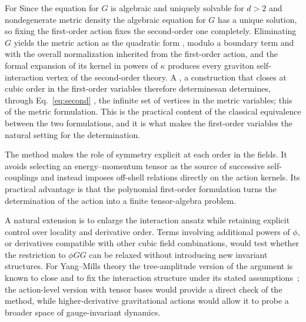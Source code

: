 \documentclass[prd,aps,preprint,superscriptaddress,nofootinbib,amsmath,amssymb,eqsecnum]{revtex4-2}
\providecommand{\DIFaddtex}[1]{{\protect\color{blue} \sf #1}} %
\providecommand{\DIFdeltex}[1]{{\protect\color{red} \scriptsize #1}} %
\providecommand{\DIFaddbegin}{} %
\providecommand{\DIFaddend}{} %
\providecommand{\DIFdelbegin}{} %
\providecommand{\DIFdelend}{} %
\providecommand{\DIFadd}[1]{\texorpdfstring{\DIFaddtex{#1}}{#1}} %
\providecommand{\DIFdel}[1]{\texorpdfstring{\DIFdeltex{#1}}{}} %
\begin{document}
\DIFdelbegin \DIFdel{For }\DIFdelend \DIFaddbegin \DIFadd{Since the equation for $G$ is algebraic and uniquely solvable for }\DIFaddend $d>2$ and nondegenerate
metric density\DIFdelbegin \DIFdel{the algebraic equation for $G$ has a unique
solution, so fixing the first-order action fixes the second-order one completely.
Eliminating $G$ yields the metric action as the quadratic form }%
\DIFdel{, modulo a boundary term and with the overall normalization inherited from the first-order action, and
the formal expansion of its kernel in powers of $\kappa$ produces every graviton
self-interaction vertex of the second-order theory. A }\DIFdelend \DIFaddbegin \DIFadd{, a }\DIFaddend construction that closes at cubic order in the first-order variables
\DIFdelbegin \DIFdel{therefore determinesan }\DIFdelend \DIFaddbegin \DIFadd{determines, through Eq.~}\eqref{eq:second}\DIFadd{, the }\DIFaddend infinite set of vertices \DIFdelbegin \DIFdel{in the metric
variables; this }\DIFdelend \DIFaddbegin \DIFadd{of the metric
formulation. This }\DIFaddend is the practical content of the classical equivalence between the two
formulations, and it is what makes the first-order variables the natural setting for the
determination.

The method makes the role of symmetry explicit at each order in the fields. It avoids
selecting an energy--momentum tensor as the source of successive self-couplings and instead
imposes off-shell relations directly on the action kernels. Its practical advantage is that
the polynomial first-order formulation turns the determination of the action into a finite tensor-algebra
problem.

A natural extension is to enlarge the interaction ansatz while retaining explicit control
over locality and derivative order. Terms involving additional powers of $\phi$, or
derivatives compatible with other cubic field combinations, would test whether the
restriction to $\phi GG$ can be relaxed without introducing new invariant structures.
For Yang--Mills theory the tree-amplitude version of the argument is known to close and
to fix the interaction structure under its stated assumptions~\cite{BrandtFrenkel1996}; the
action-level version with tensor bases would provide a direct check of the method, while higher-derivative gravitational
actions would allow it to probe a broader space of gauge-invariant dynamics.
\end{document}
